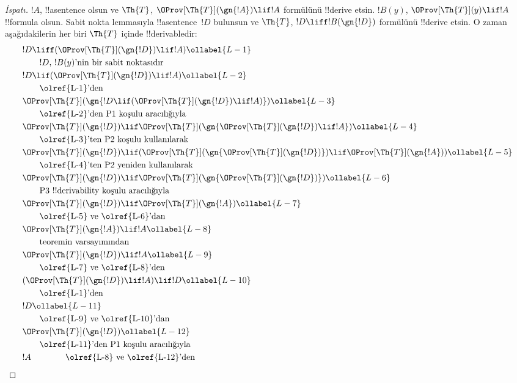 \documentclass[../../../include/open-logic-section]{subfiles}
\begin{document}
\begin{proof}[ İspatı]
$!A$, !!a{sentence} olsun ve $\Th{T}$,
$\OProv[\Th{T}](\gn{!A}) \lif !A$ formülünü !!{derive} etsin. $!B(y)$,
$\OProv[\Th{T}](y) \lif !A$ !!{formula} olsun. Sabit nokta lemmasıyla
!!a{sentence}~$!D$ bulunsun ve $\Th{T}$, $!D \liff !B(\gn{!D})$
formülünü !!{derive} etsin.
O zaman aşağıdakilerin her biri $\Th{T}$ içinde !!{derivable}{}dir:
\begin{align}
  & !D \liff (\OProv[\Th{T}](\gn{!D}) \lif !A) \ollabel{L-1}\\
  & \qquad \text{$!D$, $!B(y)$'nin bir sabit noktasıdır}\notag \\
  & !D \lif (\OProv[\Th{T}](\gn{!D}) \lif !A) \ollabel{L-2}\\
  & \qquad\text{\olref{L-1}'den}\notag\\
  & \OProv[\Th{T}](\gn{!D \lif (\OProv[\Th{T}](\gn{!D}) \lif !A)}) \ollabel{L-3}\\
  & \qquad \text{\olref{L-2}'den P1 koşulu aracılığıyla}\notag \\
  & \OProv[\Th{T}](\gn{!D}) \lif \OProv[\Th{T}](\gn{\OProv[\Th{T}](\gn{!D}) \lif !A})
  \ollabel{L-4}\\
  &\qquad \text{\olref{L-3}'ten P2 koşulu kullanılarak}\notag \\
  & \OProv[\Th{T}](\gn{!D}) \lif (\OProv[\Th{T}](\gn{\OProv[\Th{T}](\gn{!D})}) \lif \OProv[\Th{T}](\gn{!A})) \ollabel{L-5}\\
  &\qquad \text{\olref{L-4}'ten P2 yeniden kullanılarak} \notag\\
& \OProv[\Th{T}](\gn{!D}) \lif \OProv[\Th{T}](\gn{\OProv[\Th{T}](\gn{!D})}) \ollabel{L-6}\\
  & \qquad\text{P3 !!{derivability} koşulu aracılığıyla} \notag\\
  & \OProv[\Th{T}](\gn{!D}) \lif \OProv[\Th{T}](\gn{!A}) \ollabel{L-7} \\
  &\qquad\text{\olref{L-5} ve \olref{L-6}'dan}\notag\\
  & \OProv[\Th{T}](\gn{!A}) \lif !A \ollabel{L-8}\\
  &\qquad\text{teoremin varsayımından} \notag\\
  & \OProv[\Th{T}](\gn{!D}) \lif !A \ollabel{L-9}\\
  &\qquad\text{\olref{L-7} ve \olref{L-8}'den}\notag\\
  & (\OProv[\Th{T}](\gn{!D}) \lif !A) \lif !D \ollabel{L-10}\\
  & \qquad \text{\olref{L-1}'den}\notag \\
  & !D \ollabel{L-11}\\
  & \qquad\text{\olref{L-9} ve \olref{L-10}'dan}\notag \\
  & \OProv[\Th{T}](\gn{!D}) \ollabel{L-12}\\
  & \qquad\text{\olref{L-11}'den P1 koşulu aracılığıyla}\notag \\
  & !A \qquad\qquad\text{\olref{L-8} ve \olref{L-12}'den}\notag
\end{align}
\end{proof}
\end{document}
